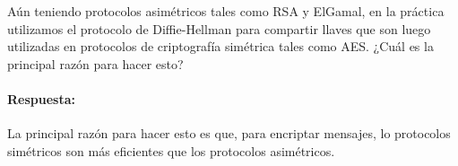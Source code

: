 
Aún teniendo protocolos asimétricos tales como RSA y ElGamal, en la práctica utilizamos el protocolo de Diffie-Hellman para compartir llaves que son luego utilizadas en protocolos de criptografía simétrica tales como AES. ¿Cuál es la principal razón para hacer esto?
\paragraph{Respuesta:} La principal razón para hacer esto es que, para encriptar mensajes, lo protocolos simétricos son más eficientes que los protocolos asimétricos.



